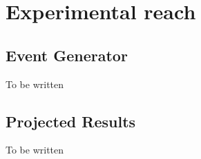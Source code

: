 \chapter{Experimental reach}
\label{chap:reach}

\section{Event Generator}
To be written

\section{Projected Results}
To be written


